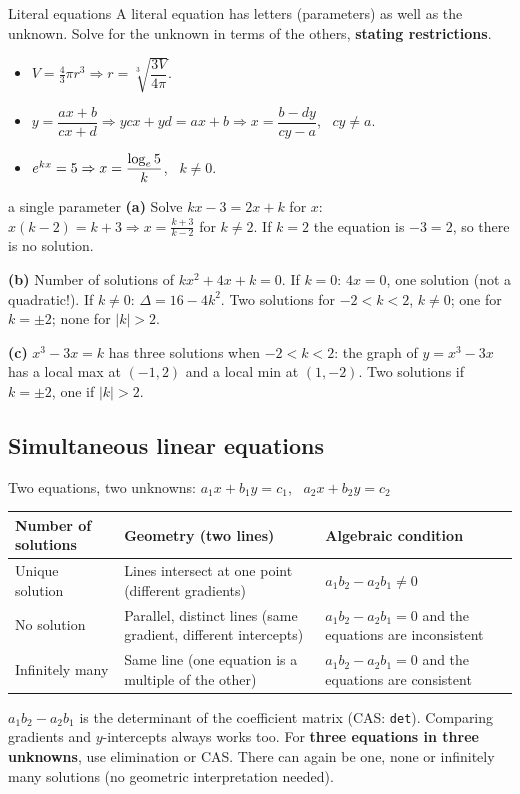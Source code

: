 \begin{cols}
\begin{keyres}{Literal equations}
A literal equation has letters (parameters) as well as the unknown. Solve for the unknown in terms of the others, \textbf{stating restrictions}.
\begin{itemize}
  \item $V=\frac43\pi r^3\Rightarrow r=\sqrt[3]{\dfrac{3V}{4\pi}}$.
  \item $y=\dfrac{ax+b}{cx+d}\Rightarrow ycx+yd=ax+b\Rightarrow x=\dfrac{b-dy}{cy-a}$, \ $cy\ne a$.
  \item $e^{kx}=5\Rightarrow x=\dfrac{\log_e5}{k}$, \ $k\ne0$.
\end{itemize}
\end{keyres}
\nextcol
\begin{example}{a single parameter}
\textbf{(a)} Solve $kx-3=2x+k$ for $x$: $x(k-2)=k+3\Rightarrow x=\frac{k+3}{k-2}$ for $k\ne2$. If $k=2$ the equation is $-3=2$, so there is no solution.\par
\textbf{(b)} Number of solutions of $kx^2+4x+k=0$. If $k=0$: $4x=0$, one solution (not a quadratic!). If $k\ne0$: $\Delta=16-4k^2$. Two solutions for $-2<k<2$, $k\ne0$; one for $k=\pm2$; none for $|k|>2$.\par
\textbf{(c)} $x^3-3x=k$ has three solutions when $-2<k<2$: the graph of $y=x^3-3x$ has a local max at $(-1,2)$ and a local min at $(1,-2)$. Two solutions if $k=\pm2$, one if $|k|>2$.
\end{example}
\end{cols}

\subsection{Simultaneous linear equations}
\label{sec:simul}

\begin{keyres}{Two equations, two unknowns: $a_1x+b_1y=c_1$, \ $a_2x+b_2y=c_2$}
\begin{center}
\small
\begin{tabularx}{\linewidth}{@{}lLL@{}}
\toprule
Number of solutions & Geometry (two lines) & Algebraic condition \\
\midrule
Unique solution & Lines intersect at one point (different gradients) & $a_1b_2-a_2b_1\ne0$ \\
No solution & Parallel, distinct lines (same gradient, different intercepts) & $a_1b_2-a_2b_1=0$ and the equations are inconsistent \\
Infinitely many & Same line (one equation is a multiple of the other) & $a_1b_2-a_2b_1=0$ and the equations are consistent \\
\bottomrule
\end{tabularx}
\end{center}
$a_1b_2-a_2b_1$ is the determinant of the coefficient matrix (CAS: \texttt{det}). Comparing gradients and $y$-intercepts always works too. For \textbf{three equations in three unknowns}, use elimination or CAS. There can again be one, none or infinitely many solutions (no geometric interpretation needed).
\end{keyres}

